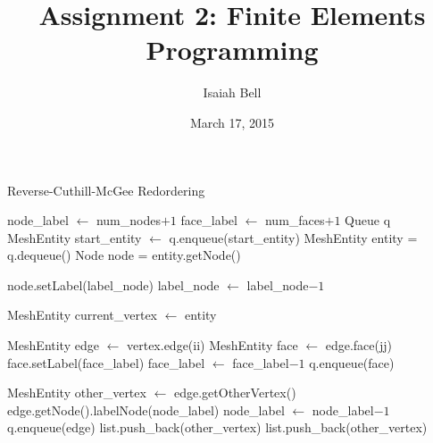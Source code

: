 \documentclass{article}
\begin{document}
\title{Assignment 2: Finite Elements Programming}
\date{March 17, 2015}   
\author{Isaiah Bell} 
\maketitle
  
\begin{algorithm}[ht]
\caption{Reverse-Cuthill-McGee Redordering}\label{RCM}
\begin{algorithmic}
    \State node\_label $\gets$ num\_nodes$ + 1$
    \State face\_label $\gets$ num\_faces$ + 1$
    \State Queue q
    \State MeshEntity start\_entity $\gets$ 
    \State q.enqueue(start\_entity)
        \State MeshEntity entity = q.dequeue()
        \State Node node = entity.getNode()

            \State node.setLabel(label\_node)
            \State label\_node $\gets$ label\_node$ - 1$
        \EndIf

            \State {}
            \State MeshEntity current\_vertex $\gets$ entity 

                \State MeshEntity edge $\gets$ vertex.edge(ii)
                    \State MeshEntity face $\gets$ edge.face(jj)
                        \State face.setLabel(face\_label)
                        \State face\_label $\gets$ face\_label$ - 1$
                    \EndIf
                            \State q.enqueue(face)
                        \EndIf

                    \EndIf
                \EndFor

                \State MeshEntity other\_vertex $\gets$ edge.getOtherVertex()
                        \State edge.getNode().labelNode(node\_label)
                        \State node\_label $\gets$ node\_label$ - 1$
                    \Else
                        \State q.enqueue(edge)
                        \State list.push\_back(other\_vertex)
                    \EndIf
                \Else
                        \State list.push\_back(other\_vertex)
                    \EndIf
                \EndIf
            \EndFor

\end{algorithmic}
\end{algorithm}
\end{document}
